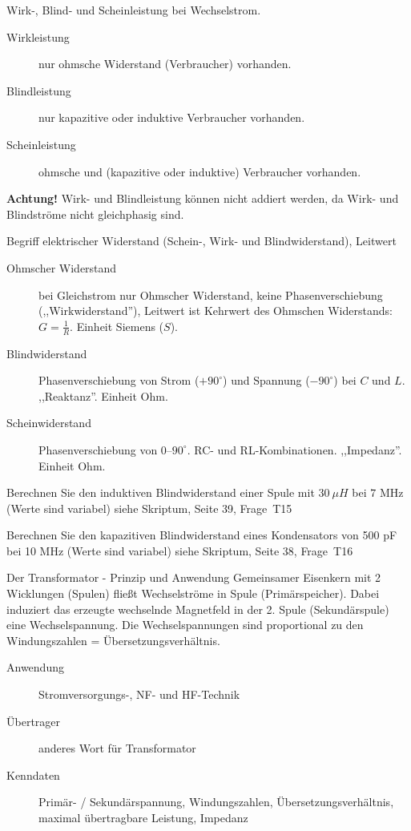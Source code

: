 \documentclass[avery5371,grid,frame,a4paper]{flashcards}
\newcommand{\card}[3]{
  \begin{flashcard}[{\chap} -- #1]{#2}#3\end{flashcard}
}
\begin{document}
\card{13}{Wirk-, Blind- und Scheinleistung bei Wechselstrom.}{
  \begin{description}
    \item[Wirkleistung] nur ohmsche Widerstand (Verbraucher) vorhanden.
    \item[Blindleistung] nur kapazitive oder induktive Verbraucher vorhanden.
    \item[Scheinleistung] ohmsche und (kapazitive oder induktive) Verbraucher vorhanden.
  \end{description}
  {\small
    \textbf{Achtung!}
      Wirk- und Blindleistung können nicht addiert werden,
      da Wirk- und Blindströme nicht gleichphasig sind.
  }
}


\card{14}{Begriff elektrischer Widerstand (Schein-, Wirk- und Blindwiderstand), Leitwert}{
  \begin{description}
    \item[Ohmscher Widerstand] bei Gleichstrom nur Ohmscher Widerstand,
      keine Phasenverschiebung (,,Wirkwiderstand''),
      Leitwert ist Kehrwert des Ohmschen Widerstands: $G = \frac1{R}$. Einheit Siemens ($S$).
    \item[Blindwiderstand]
      Phasenverschiebung von Strom ($+90^\circ$) und Spannung ($-90^\circ$) bei $C$ und $L$.
      ,,Reaktanz''. Einheit Ohm.
    \item[Scheinwiderstand]
      Phasenverschiebung von 0--$90^\circ$. RC- und RL-Kombinationen. ,,Impedanz''. Einheit Ohm.
  \end{description}
}

\card{15}{Berechnen Sie den induktiven Blindwiderstand einer Spule mit $30~\mu H$ bei $7$ MHz (Werte sind variabel)}{
  \centering
  siehe Skriptum, Seite 39, Frage~T15
}

\card{16}{Berechnen Sie den kapazitiven Blindwiderstand eines Kondensators von 500 pF bei 10 MHz (Werte sind variabel)}{
  \centering
  siehe Skriptum, Seite 38, Frage~T16
}

\card{17}{Der Transformator - Prinzip und Anwendung}{
  \small
  Gemeinsamer Eisenkern mit 2 Wicklungen (Spulen) fließt Wechselströme in Spule (Primärspeicher).
  Dabei induziert das erzeugte wechselnde Magnetfeld in der 2. Spule (Sekundärspule)
  eine Wechselspannung. Die Wechselspannungen sind proportional zu den Windungszahlen
  = Übersetzungsverhältnis.
  \begin{description}
    \item[Anwendung] Stromversorgungs-, NF- und HF-Technik
    \item[Übertrager] anderes Wort für Transformator
    \item[Kenndaten]
      Primär- / Sekundärspannung, Windungszahlen, Übersetzungsverhältnis,
      maximal übertragbare Leistung, Impedanz
  \end{description}
}
\end{document}
